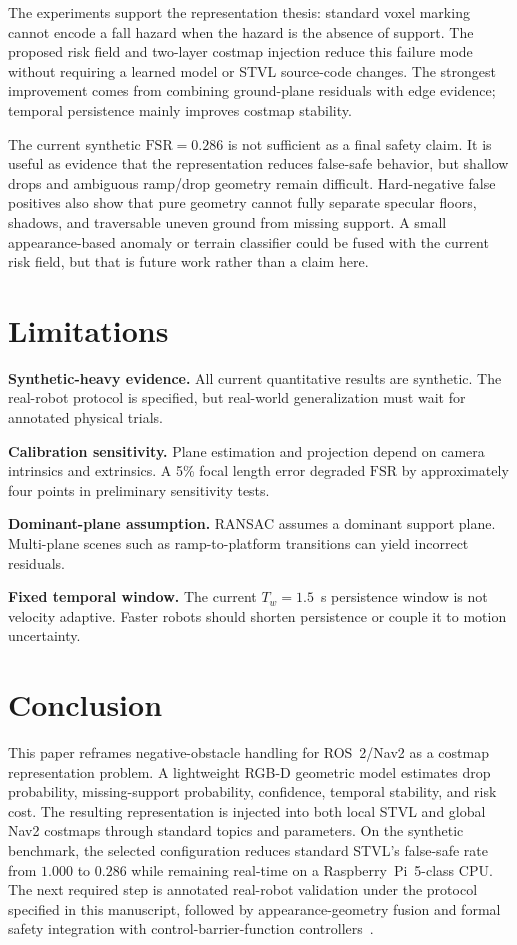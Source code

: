 \documentclass[journal]{IEEEtran}
\newcommand{\fsr}{\mathrm{FSR}}
\begin{document}
The experiments support the representation thesis: standard voxel marking cannot encode a
fall hazard when the hazard is the absence of support. The proposed risk field and
two-layer costmap injection reduce this failure mode without requiring a learned model or
STVL source-code changes. The strongest improvement comes from combining ground-plane
residuals with edge evidence; temporal persistence mainly improves costmap stability.

The current synthetic $\fsr=0.286$ is not sufficient as a final safety claim. It is useful
as evidence that the representation reduces false-safe behavior, but shallow drops and
ambiguous ramp/drop geometry remain difficult. Hard-negative false positives also show
that pure geometry cannot fully separate specular floors, shadows, and traversable uneven
ground from missing support. A small appearance-based anomaly or terrain classifier could
be fused with the current risk field, but that is future work rather than a claim here.

\section{Limitations}
\label{sec:limitations}

\textbf{Synthetic-heavy evidence.}
All current quantitative results are synthetic. The real-robot protocol is specified, but
real-world generalization must wait for annotated physical trials.

\textbf{Calibration sensitivity.}
Plane estimation and projection depend on camera intrinsics and extrinsics. A 5\% focal
length error degraded $\fsr$ by approximately four points in preliminary sensitivity tests.

\textbf{Dominant-plane assumption.}
RANSAC assumes a dominant support plane. Multi-plane scenes such as ramp-to-platform
transitions can yield incorrect residuals.

\textbf{Fixed temporal window.}
The current $T_w=1.5$~s persistence window is not velocity adaptive. Faster robots should
shorten persistence or couple it to motion uncertainty.

\section{Conclusion}
\label{sec:conclusion}

This paper reframes negative-obstacle handling for ROS~2/Nav2 as a costmap representation
problem. A lightweight RGB-D geometric model estimates drop probability, missing-support
probability, confidence, temporal stability, and risk cost. The resulting representation is
injected into both local STVL and global Nav2 costmaps through standard topics and
parameters. On the synthetic benchmark, the selected configuration reduces standard
STVL's false-safe rate from $1.000$ to $0.286$ while remaining real-time on a
Raspberry~Pi~5-class CPU. The next required step is annotated real-robot validation under
the protocol specified in this manuscript, followed by appearance-geometry fusion and
formal safety integration with control-barrier-function controllers~\cite{ames2019control}.
\end{document}
